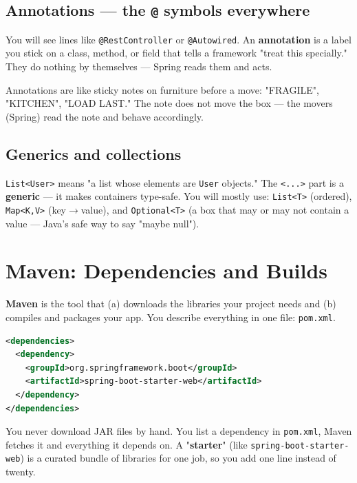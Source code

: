 \documentclass[11pt,a4paper]{article}
\begin{document}
\subsection{Annotations — the \texttt{@} symbols everywhere}

You will see lines like \texttt{@RestController} or \texttt{@Autowired}. An \textbf{annotation} is
a label you stick on a class, method, or field that tells a framework "treat this specially." They
do nothing by themselves — Spring reads them and acts.

\begin{analogy}
Annotations are like sticky notes on furniture before a move: "FRAGILE", "KITCHEN", "LOAD LAST."
The note does not move the box — the movers (Spring) read the note and behave accordingly.
\end{analogy}

\subsection{Generics and collections}

\texttt{List<User>} means "a list whose elements are \texttt{User} objects." The \texttt{<...>}
part is a \textbf{generic} — it makes containers type-safe. You will mostly use:
\texttt{List<T>} (ordered), \texttt{Map<K,V>} (key$\rightarrow$value), and \texttt{Optional<T>}
(a box that may or may not contain a value — Java's safe way to say "maybe null").

\section{Maven: Dependencies and Builds}

\textbf{Maven} is the tool that (a) downloads the libraries your project needs and (b) compiles and
packages your app. You describe everything in one file: \texttt{pom.xml}.

\begin{lstlisting}[language=XML]
<dependencies>
  <dependency>
    <groupId>org.springframework.boot</groupId>
    <artifactId>spring-boot-starter-web</artifactId>
  </dependency>
</dependencies>
\end{lstlisting}

\begin{keyidea}
You never download JAR files by hand. You list a dependency in \texttt{pom.xml}, Maven fetches it
and everything it depends on. A "\textbf{starter}" (like \texttt{spring-boot-starter-web}) is a
curated bundle of libraries for one job, so you add one line instead of twenty.
\end{keyidea}
\end{document}
